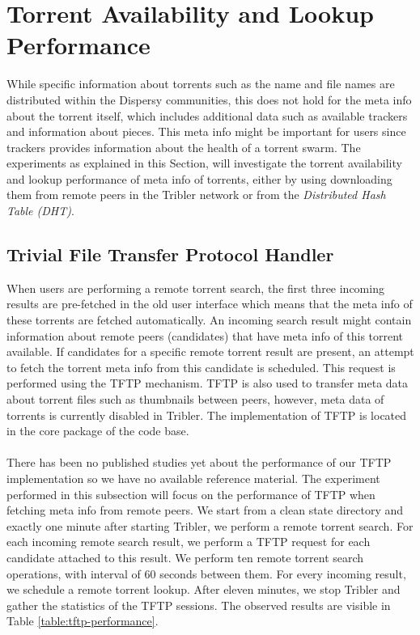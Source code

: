 \section{Torrent Availability and Lookup Performance}
While specific information about torrents such as the name and file names are distributed within the Dispersy communities, this does not hold for the meta info about the torrent itself, which includes additional data such as available trackers and information about pieces. This meta info might be important for users since trackers provides information about the health of a torrent swarm. The experiments as explained in this Section, will investigate the torrent availability and lookup performance of meta info of torrents, either by using downloading them from remote peers in the Tribler network or from the \emph{Distributed Hash Table (DHT)}.

\subsection{Trivial File Transfer Protocol Handler}
When users are performing a remote torrent search, the first three incoming results are pre-fetched in the old user interface which means that the meta info of these torrents are fetched automatically. An incoming search result might contain information about remote peers (candidates) that have meta info of this torrent available. If candidates for a specific remote torrent result are present, an attempt to fetch the torrent meta info from this candidate is scheduled. This request is performed using the TFTP mechanism\cite{sollins1992tftp}. TFTP is also used to transfer meta data about torrent files such as thumbnails between peers, however, meta data of torrents is currently disabled in Tribler. The implementation of TFTP is located in the core package of the code base.\\\\
There has been no published studies yet about the performance of our TFTP implementation so we have no available reference material. The experiment performed in this subsection will focus on the performance of TFTP when fetching meta info from remote peers. We start from a clean state directory and exactly one minute after starting Tribler, we perform a remote torrent search. For each incoming remote search result, we perform a TFTP request for each candidate attached to this result. We perform ten remote torrent search operations, with interval of 60 seconds between them. For every incoming result, we schedule a remote torrent lookup. After eleven minutes, we stop Tribler and gather the statistics of the TFTP sessions. The observed results are visible in Table \ref{table:tftp-performance}.\\

